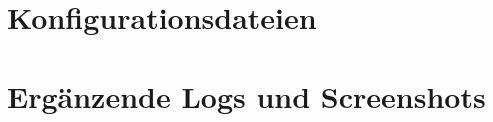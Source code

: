 \chapter{Konfigurationsdateien}\label{chap:anhang-konfiguration}


\chapter{Ergänzende Logs und Screenshots}\label{chap:anhang-logs}

